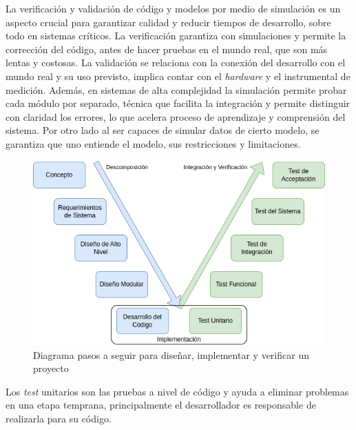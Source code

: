 La verificación y validación de código y modelos por medio de simulación es
un aspecto crucial para garantizar calidad y reducir tiempos de desarrollo,
sobre todo en sistemas críticos. La verificación garantiza con simulaciones y
permite la corrección del código, antes de hacer pruebas en el mundo real, que
son más lentas y costosas. La validación se relaciona con la conexión del
desarrollo con el mundo real y su uso previsto, implica contar con el
\textit{hardware} y el instrumental de medición. Además, en sistemas de alta
complejidad la simulación permite probar cada módulo por separado, técnica que
facilita la integración y permite distinguir con claridad los errores, lo que
acelera proceso de aprendizaje y comprensión del sistema. Por otro lado al ser
capaces de simular datos de cierto modelo, se garantiza que uno entiende el
modelo, sus restricciones y limitaciones.

\vspace{1cm}
\begin{figure}[htbp]
    \centering
    \includegraphics[width=\linewidth]{./Figures/verif.png}
    \caption{Diagrama pasos a seguir para diseñar, implementar y verificar un proyecto}\label{fig:sdi}
\end{figure}
\vspace{1cm}


Los \textit{test} unitarios son las pruebas a nivel de código y ayuda a eliminar
problemas en una etapa temprana, principalmente el desarrollador es responsable
de realizarla para su código.

